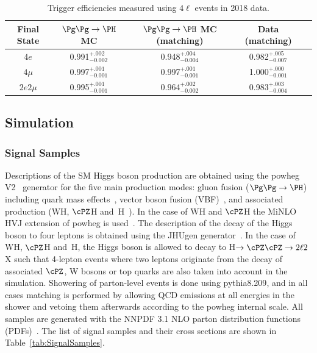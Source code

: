 \begin{table}[h]
	\centering
	\begin{tabular}{|c|c|c|c|c|} 
		\hline %
		Final State  & $\ggH$ MC & $\ggH$ MC (matching)  & Data (matching)   \\
		\hline %
		$4e$  & 0.991$^{+.002}_{-0.002}$ & 0.948$^{+.004}_{-0.004}$ & 0.982$^{+.005}_{-0.007}$ \\
		$4\mu$  & 0.997$^{+.001}_{-0.001}$ & 0.997$^{+.001}_{-0.001}$ & 1.000$^{+.000}_{-0.001}$ \\
		$2e2\mu$  & 0.995$^{+.001}_{-0.001}$ & 0.964$^{+.002}_{-0.002}$ & 0.983$^{+.003}_{-0.004}$ \\
		\hline %
	\end{tabular}
	\caption{
	Trigger efficiencies measured using $4\ell$ events in 2018 data.}
	\label{tab:TrigEffC}
\end{table}

\subsection{Simulation}

\subsubsection{Signal Samples}

Descriptions of the SM Higgs boson production are obtained using the 
{\sc powheg V2}~\cite{Alioli:2008gx,Nason:2004rx,Frixione:2007vw} generator for the five main production modes: 
gluon fusion ($\ggH$) including quark mass effects~\cite{Bagnaschi:2011tu}, vector boson fusion 
(VBF)~\cite{Nason:2009ai}, and associated production (WH, $\cPZ$H and \ttbar$\,$H~\cite{Hartanto:2015uka}). 
In the case of WH and $\cPZ$H the {\sc MiNLO HVJ} extension of {\sc powheg} is used~\cite{Luisoni:2013kna}. 
The description of the decay of the Higgs boson to four leptons is obtained using the {\sc JHUgen} 
generator~\cite{Gao:2010qx}. In the case of WH, $\cPZ$H and \ttbar$\,$H, the Higgs boson is allowed
to decay to H$\to \cPZ \cPZ \to 2\ell2$X such that 4-lepton events where two leptons originate from 
the decay of associated $\cPZ$, W bosons or top quarks are also taken into account in the simulation. 
Showering of parton-level events is done using {\sc pythia8.209}, and in all cases matching is performed by 
allowing QCD emissions at all energies in the shower and vetoing them afterwards according to the 
{\sc powheg} internal scale. All samples are generated with the NNPDF 3.1 NLO parton distribution 
functions (PDFs)~\cite{Ball:2014uwa}. The list of signal samples and their cross sections are shown in 
Table~\ref{tab:SignalSamples}.

